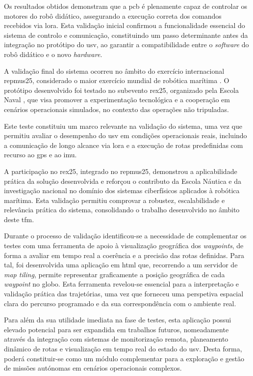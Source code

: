 Os resultados obtidos demonstram que a \gls{pcb} é plenamente capaz de controlar os motores do robô didático, assegurando a execução correta dos comandos recebidos via \gls{lora}. Esta validação inicial confirmou a funcionalidade essencial do sistema de controlo e comunicação, constituindo um passo determinante antes da integração no protótipo do \gls{usv}, ao garantir a compatibilidade entre o \emph{software} do robô didático \cite{didactic-robot-thesis} e o novo \emph{hardware}.  

A validação final do sistema ocorreu no âmbito do exercício internacional \gls{repmus25}, considerado o maior exercício mundial de robótica marítima \cite{iddportugal-repmus, isel-repmus, enidh-repmus, sapo-repmus}. O protótipo desenvolvido foi testado no subevento \gls{rex25}, organizado pela Escola Naval \cite{escolanaval-repmus}, que visa promover a experimentação tecnológica e a cooperação em cenários operacionais simulados, no contexto das operações não tripuladas. 

Este teste constituiu um marco relevante na validação do sistema, uma vez que permitiu avaliar o desempenho do \gls{usv} em condições operacionais reais, incluindo a comunicação de longo alcance via \gls{lora} e a execução de rotas predefinidas com recurso ao \gls{gps} e ao \gls{imu}.  

A participação no \gls{rex25}, integrado no \gls{repmus25}, demonstrou a aplicabilidade prática da solução desenvolvida e reforçou o contributo da Escola Náutica e da investigação nacional no domínio dos sistemas ciberfísicos aplicados à robótica marítima. Esta validação permitiu comprovar a robustez, escalabilidade e relevância prática do sistema, consolidando o trabalho desenvolvido no âmbito deste \gls{tfm}.

Durante o processo de validação identificou-se a necessidade de complementar os testes com uma ferramenta de apoio à visualização geográfica dos \emph{waypoints}, de forma a avaliar em tempo real a coerência e a precisão das rotas definidas. Para tal, foi desenvolvida uma aplicação em \gls{html} que, recorrendo a um servidor de \emph{map tiling}, permite representar graficamente a posição geográfica de cada \emph{waypoint} no globo. Esta ferramenta revelou-se essencial para a interpretação e validação prática das trajetórias, uma vez que forneceu uma perspetiva espacial clara do percurso programado e da sua correspondência com o ambiente real.  

Para além da sua utilidade imediata na fase de testes, esta aplicação possui elevado potencial para ser expandida em trabalhos futuros, nomeadamente através da integração com sistemas de monitorização remota, planeamento dinâmico de rotas e visualização em tempo real do estado do \gls{usv}. Desta forma, poderá constituir-se como um módulo complementar para a exploração e gestão de missões autónomas em cenários operacionais complexos.  

